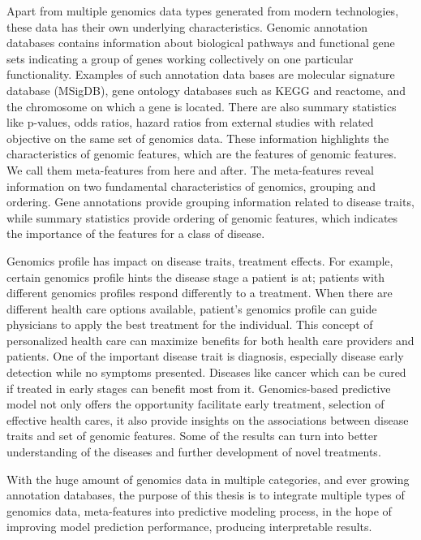 Apart from multiple genomics data types generated from modern technologies, these data has their own underlying characteristics. Genomic annotation databases contains information about biological pathways and functional gene sets indicating a group of genes working collectively on one particular functionality. Examples of such annotation data bases are molecular signature database (MSigDB), gene ontology databases such as KEGG and reactome, and the chromosome on which a gene is located. There are also summary statistics like p-values, odds ratios, hazard ratios from external studies with related objective on the same set of genomics data. These information highlights the characteristics of genomic features, which are the features of genomic features. We call them meta-features from here and after. The meta-features reveal information on two fundamental characteristics of genomics, grouping and ordering. Gene annotations provide grouping information related to disease traits, while summary statistics provide ordering of genomic features, which indicates the importance of the features for a class of disease. 

Genomics profile has impact on disease traits, treatment effects. For example, certain genomics profile hints the disease stage a patient is at; patients with different genomics profiles respond differently to a treatment. When there are different health care options available, patient's genomics profile can guide physicians to apply the best treatment for the individual. This concept of personalized health care can maximize benefits for both health care providers and patients. One of the important disease trait is diagnosis, especially disease early detection while no symptoms presented. Diseases like cancer which can be cured if treated in early stages can benefit most from it. Genomics-based predictive model not only offers the opportunity facilitate early treatment, selection of effective health cares, it also provide insights on the associations between disease traits and set of genomic features. Some of the results can turn into better understanding of the diseases and further development of novel treatments.

With the huge amount of genomics data in multiple categories, and ever growing annotation databases, the purpose of this thesis is to integrate multiple types of genomics data, meta-features into predictive modeling process, in the hope of improving model prediction performance, producing interpretable results.

